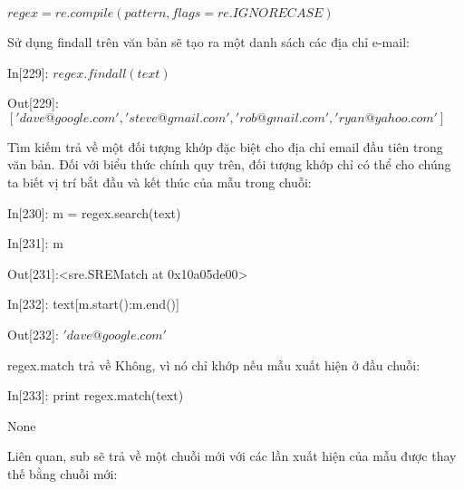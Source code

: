 \hspace{1cm}$regex = re.compile(pattern, flags=re.IGNORECASE)$  \par
Sử dụng findall trên văn bản sẽ tạo ra một danh sách các địa chỉ e-mail:\par
\hspace{1cm}In\hspace{3mm}[229]:\hspace{3mm} $regex.findall(text)$ \par
\hspace{1cm}Out[229]:\hspace{3mm} $['dave@google.com', 'steve@gmail.com', 'rob@gmail.com','ryan@yahoo.com']$\par
Tìm kiếm trả về một đối tượng khớp đặc biệt cho địa chỉ email đầu tiên trong văn bản. Đối với biểu thức chính quy trên, đối tượng khớp chỉ có thể cho chúng ta biết vị trí bắt đầu và kết thúc của mẫu trong chuỗi:\par 
\hspace{1cm}In\hspace{3mm}[230]:\hspace{3mm} m = regex.search(text)\par
\hspace{1cm}In\hspace{3mm}[231]:\hspace{3mm} m \par
\hspace{1cm}Out[231]:\hspace{3mm}<sre.SREMatch at 0x10a05de00>\par
\hspace{1cm}In\hspace{3mm}[232]:\hspace{3mm} text[m.start():m.end()] \par
\hspace{1cm}Out[232]:\hspace{3mm} $'dave@google.com'$ \par
regex.match trả về Không, vì nó chỉ khớp nếu mẫu xuất hiện ở đầu chuỗi:\par
\hspace{1cm}In\hspace{3mm}[233]:\hspace{3mm} print regex.match(text) \par
\hspace{1cm}None\par
Liên quan, sub sẽ trả về một chuỗi mới với các lần xuất hiện của mẫu được thay thế bằng chuỗi mới:\par

